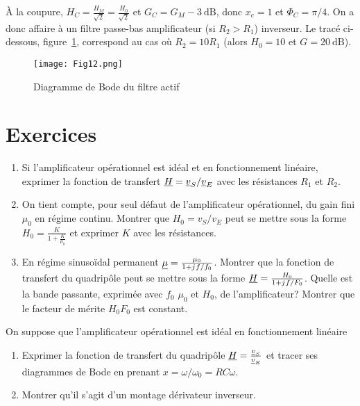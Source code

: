 À la coupure, \(H_C = \frac{H_M}{\sqrt{2}} = \frac{H_0}{\sqrt{2}}\) et \(G_C = 
G_M -\SI{3}{\dB}\), donc \(x_c=1\) et \(\Phi_C = \pi/4\). On a donc affaire à 
un filtre passe-bas amplificateur (si \(R_2>R_1\)) inverseur. Le tracé 
ci-dessous, figure~\ref{fig:BodeAOP}, correspond au cas où \(R_2=10R_1\) (alors 
\(H_0=10\) et \(G = \SI{20}{\dB}\)).
\begin{figure}[h!]%
    \centering
    \texttt{[image: Fig12.png]}
    \caption{Diagramme de Bode du filtre actif}
    \label{fig:BodeAOP}
\end{figure}%
\clearpage
\section{Exercices}%
\begin{exercice}%
\begin{enumerate}%
  \item Si l'amplificateur opérationnel est idéal et en fonctionnement 
    linéaire, exprimer la fonction de transfert \(\underline{H} = 
    \underline{v}_S/\underline{v}_E\) avec les résistances \(R_1\) et \(R_2\).
  \item On tient compte, pour seul défaut de l'amplificateur opérationnel, du 
    gain fini \(\mu_0\) en régime continu. Montrer que \(H_0 = v_S / v_E\) peut 
    se mettre sous la forme \(H_0 = \frac{K}{1+\frac{K}{\mu_0}}\) et exprimer 
    \(K\) avec les résistances.
  \item En régime sinusoïdal permanent \(\underline{\mu} = \frac{\mu_0}{1+ {j\mkern1mu} 
    f/f_0}\). Montrer que la fonction de transfert du quadripôle peut se mettre 
    sous la forme \(\underline{H} = \frac{H_0}{1+{j\mkern1mu} f/F_0}\). Quelle est la bande 
    passante, exprimée avec \(f_0\) \(\mu_0\) et \(H_0\),  de l'amplificateur? 
    Montrer que le facteur de mérite \(H_0F_0\) est constant.
\end{enumerate}%
\end{exercice}%
\begin{exercice}%
On suppose que l'amplificateur opérationnel est idéal en fonctionnement 
  linéaire
\begin{enumerate}%
  \item Exprimer la fonction de transfert du quadripôle \(\underline{H} = 
    \frac{\underline{v}_S}{\underline{v}_E}\) et tracer ses diagrammes de Bode 
    en prenant \(x = \omega/\omega_0=RC\omega\).
  \item Montrer qu'il s'agit d'un montage dérivateur inverseur.
\end{enumerate}%
\end{exercice}%
